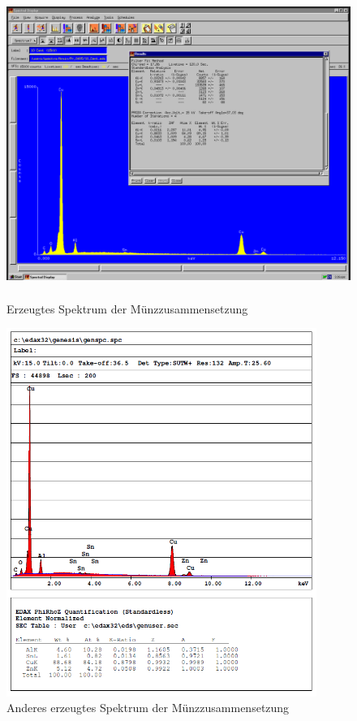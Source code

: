 \documentclass[12pt,english,ngerman]{scrartcl}
\begin{document}
\begin{figure}[H]
	\begin{center}
		\includegraphics[width=\textwidth,height=10cm]{./figures/qualitativ1.png}
	\end{center}
	\caption{Erzeugtes Spektrum der Münzzusammensetzung~\cite{zankel_quantitative_nodate}
	}\label{fig:qualitativ1}
\end{figure}

\begin{figure}[H]
	\begin{center}
		\includegraphics[width=\textwidth,height=12cm]{./figures/qualitativ2.png}
	\end{center}
	\caption{Anderes erzeugtes Spektrum der Münzzusammensetzung~\cite{zankel_quantitative_nodate}
	}\label{fig:qualitativ2}
\end{figure}
\end{document}
